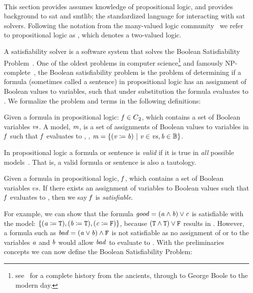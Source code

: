 ~\label{section:sat-solving}

This section provides assumes knowledge of propositional logic, and provides
background to \acl{sat} and \ac{smtlib}; the standardized language for
interacting with \ac{sat} solvers. Following the notation from the many-valued
logic community~\cite{Rescher1969-RESML} we refer to propositional logic as
\pl{}, which denotes a two-valued logic.

A satisfiability solver is a software system that solves the Boolean
Satisfiability Problem~\cite{russelNorvig}. One of the oldest problems in
computer science\footnote{see~\citet{BBH+09} for a complete history from the
  ancients, through to George Boole to the modern day.} and famously
NP-complete~\cite{10.1145/800157.805047}, the Boolean satisfiability problem is
the problem of determining if a formula (sometimes called a sentence) in
propositional logic has an assignment of Boolean values to variables, such that
under substitution the formula evaluates to \tru{}. We formalize the problem and
terms in the following definitions:

\begin{definition}[Model]
  Given a formula in propositional logic: $\mathit{f} \in {C\textsubscript{2}}{}$, which contains a
  set of Boolean variables $\mathit{vs}$. A model, $\mathit{m}$, is a set of assignments
  of Boolean values to variables in $\mathit{f}$ such that $\mathit{f}$ evaluates to
  \tru{}, \ie{}, $\mathit{m = \{ (v \coloneqq{} b)\ |\ v \in vs, b \in \mathbb{B}} \}$.
\end{definition}

\begin{corollary}[Validity]
  In propositional logic a formula or
  sentence is \emph{valid} if it is true in \emph{all} possible
  models~\cite{russelNorvig}. That is, a valid formula or sentence is also a
  tautology.
\end{corollary}

\begin{definition}[Satisfiable]
  Given a formula in propositional logic, $\mathit{f}$, which contains a set of
  Boolean variables $vs$. If there exists an assignment of variables to Boolean
  values such that $\mathit{f}$ evaluates to \tru{}, then we say $\mathit{f}$ is
  \emph{satisfiable}.
\end{definition}

For example, we can show that the formula $\mathit{good = (a \wedge b) \vee c}$ is
satisfiable with the model: $\{\mathit{(a \coloneqq{}{} \texttt{T}{}), (b \coloneqq{}{} \texttt{T}{}),
  (c \coloneqq{}{} \texttt{F}{})}\}$, because $(\texttt{T}{} \wedge{} \texttt{T}{}) \vee{} \texttt{F}{}$
results in \tru{}. However, a formula such as $\mathit{bad = (a \vee b) \wedge
  \texttt{F}{}}$ is not satisfiable as no assignment of \fls{} or \tru{} to the
variables $\mathit{a}$ and $\mathit{b}$ would allow $\mathit{bad}$ to evaluate to \tru{}.
With the preliminaries concepts we can now define the Boolean Satisfiability
Problem:

